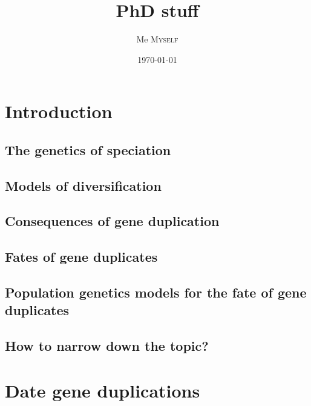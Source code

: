 \documentclass[a4paper]{beamer}
\title{PhD stuff}
\author{Me \textsc{Myself}}
\date{\today}
\begin{document}
\begin{frame}[plain]{}
    \titlepage
\end{frame}

\begin{frame}
    \tableofcontents
\end{frame}

\section{Introduction}
\subsection{The genetics of speciation}\begin{frame}{}\end{frame}
\subsection{Models of diversification}\begin{frame}{}\end{frame}
\subsection{Consequences of gene duplication}\begin{frame}{}\end{frame}
\subsection{Fates of gene duplicates}\begin{frame}{}\end{frame}
\subsection{Population genetics models for the fate of gene duplicates}\begin{frame}{}\end{frame}
\subsection{How to narrow down the topic?}\begin{frame}{}\end{frame}

\section{Date gene duplications}
\end{document}

